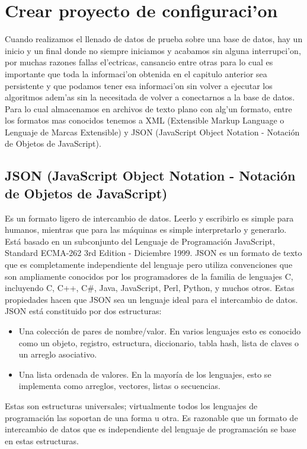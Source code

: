 \chapter{Crear proyecto de configuraci'on}

Cuando realizamos el llenado de datos de prueba sobre una base de datos, hay un inicio y un final donde no siempre iniciamos y acabamos sin alguna interrupci'on, por muchas razones fallas el'ectricas, cansancio entre otras para lo cual es importante que toda la informaci'on obtenida en el capitulo anterior sea persistente y que podamos tener esa informaci'on sin volver a ejecutar los algoritmos adem'as sin la necesitada de volver a conectarnos a la base de datos.
Para lo cual almacenamos en archivos de texto plano con alg'un formato, entre los formatos mas conocidos tenemos a XML (Extensible Markup Language o Lenguaje de Marcas Extensible) y JSON (JavaScript Object Notation - Notaci\'on de Objetos de JavaScript).

\section{JSON (JavaScript Object Notation - Notaci\'on de Objetos de JavaScript)}
Es un formato ligero de intercambio de datos. Leerlo y escribirlo es simple para humanos, mientras que para las m\'aquinas es simple interpretarlo y generarlo. Est\'a basado en un subconjunto del Lenguaje de Programaci\'on JavaScript, Standard ECMA-262 3rd Edition - Diciembre 1999. JSON es un formato de texto que es completamente independiente del lenguaje pero utiliza convenciones que son ampliamente conocidos por los programadores de la familia de lenguajes C, incluyendo C, C++, C\#, Java, JavaScript, Perl, Python, y muchos otros. Estas propiedades hacen que JSON sea un lenguaje ideal para el intercambio de datos.
JSON está constituido por dos estructuras:

\begin{itemize}
\item Una colecci\'on de pares de nombre/valor. En varios lenguajes esto es conocido como un objeto, registro, estructura, diccionario, tabla hash, lista de claves o un arreglo asociativo.
\item Una lista ordenada de valores. En la mayor\'ia de los lenguajes, esto se implementa como arreglos, vectores, listas o secuencias.
\end{itemize}

Estas son estructuras universales; virtualmente todos los lenguajes de programaci\'on las soportan de una forma u otra. Es razonable que un formato de intercambio de datos que es independiente del lenguaje de programaci\'on se base en estas estructuras.

